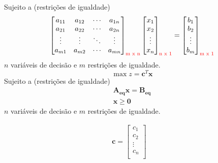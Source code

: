 \begin{frame}
\begin{mdframed}[backgroundcolor=blue!20]
{\begin{equation*}
			\end{equation*}
			{\color{red}Sujeito a (restrições de igualdade)} 
			\begin{equation*}
				\begin{bmatrix}
						a_{11} & a_{12} & \cdots & a_{1n} \\
						a_{21} & a_{22} & \cdots & a_{2n} \\
						\vdots & \vdots & \ddots & \vdots \\
						a_{m1} & a_{m2} & \cdots & a_{mn} \\
				\end{bmatrix}_{\text{\color{red}m x n}}
				\begin{bmatrix}
						x_1 \\
						x_2 \\
						\vdots \\
						x_n \\
				\end{bmatrix}_{\text{\color{red} n x 1}} = 
				\begin{bmatrix}
						b_1 \\
						b_2 \\
						\vdots \\
						b_m \\
				\end{bmatrix}_{\text{\color{red} m x 1}}  				
			\end{equation*}			
			$n$ variáveis de decisão e $m$ restrições de igualdade.
		}
		\only<5>
		{
			\begin{equation*} 
				\max z = \mathbf{c}^T \mathbf{x}
			\end{equation*}
			{\color{red}Sujeito a (restrições de igualdade)} 
			\begin{equation*}
				\begin{matrix}
					\mathbf{A_{eq}x} = \mathbf{B_{eq}}  \\
					\mathbf{x} \ge \mathbf{0}
				\end{matrix}
			\end{equation*}	
			$n$ variáveis de decisão e $m$ restrições de igualdade.		
		}		
	\end{mdframed}
	{
	\vspace{0.3cm}
	\begin{equation*}
		\begin{matrix}
			\mathbf{c} = 	\begin{bmatrix}
									c_1 \\ c_2 \\ \vdots \\ c_n \\
							\end{bmatrix} &


\end{matrix}
\end{equation*}}
\end{frame}
